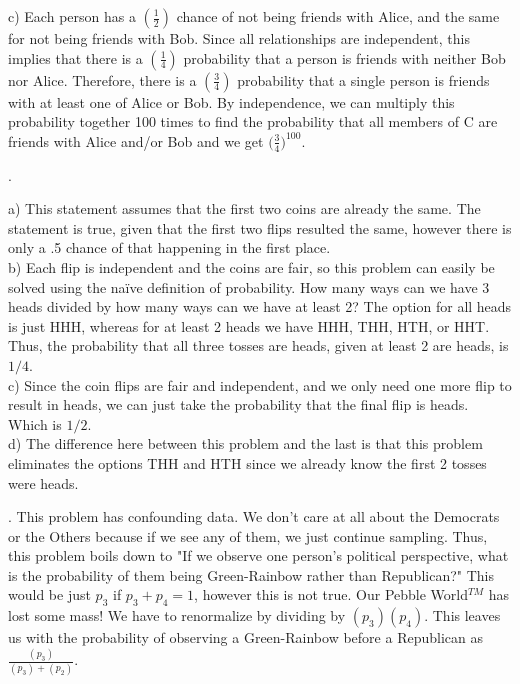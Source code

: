 \documentclass[11pt]{article}
\begin{document}
	c) Each person has a $(\frac{1}{2})$ chance of not being friends with Alice, and the same for not being friends with Bob.  Since all relationships are independent, this implies that there is a $(\frac{1}{4})$ probability that a person is friends with neither Bob nor Alice.  Therefore, there is a $(\frac{3}{4})$ probability that a single person is friends with at least one of Alice or Bob.  By independence, we can multiply this probability together 100 times to find the probability that all members of C are friends with Alice and/or Bob and we get $(\boxed{\frac{3}{4})^{100}}$.

\bigskip


. 

	a) This statement assumes that the first two coins are already the same.  The statement is true, given that the first two flips resulted the same, however there is only a .5 chance of that happening in the first place.  
\\

	b)  Each flip is independent and the coins are fair, so this problem can easily be solved using the naïve definition of probability.  How many ways can we have 3 heads divided by how many ways can we have at least 2?  
	The option for all heads is just HHH, whereas for at least 2 heads we have HHH, THH, HTH, or HHT.  Thus, the probability that all three tosses are heads, given at least 2 are heads, is $\boxed{1/4}$. 
\\

	c) Since the coin flips are fair and independent, and we only need one more flip to result in heads, we can just take the probability that the final flip is heads.  Which is $\boxed{1/2}$. 
\\

	d) The difference here between this problem and the last is that this problem eliminates the options THH and HTH since we already know the first 2 tosses were heads. 

\bigskip

. This problem has confounding data.  We don't care at all about the Democrats or the Others because if we see any of them, we just continue sampling.  Thus, this problem boils down to "If we observe one person's political perspective, what is the probability of them being Green-Rainbow rather than Republican?"  This would be just $p_{3}$ if $p_{3} + p_{4} = 1$, however this is not true.  Our Pebble World$^{TM}$ has lost some mass! We have to renormalize by dividing by $(p_{3})(p_{4})$.  This leaves us with the probability of observing a Green-Rainbow before a Republican as $\boxed{\frac{(p_{3})}{(p_{3})+(p_{2})}}$.
\end{document}
